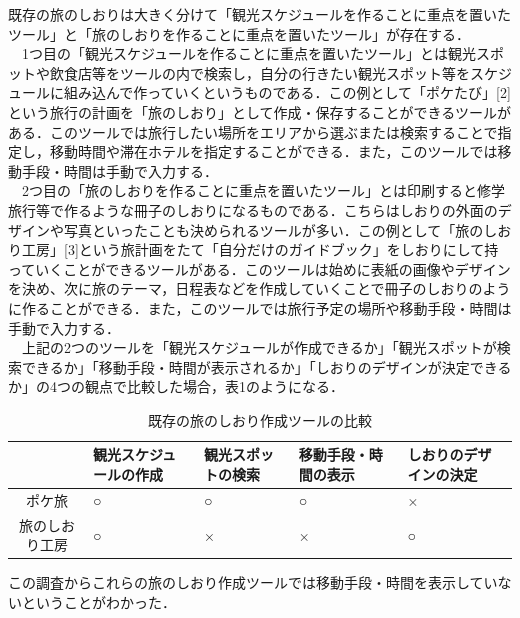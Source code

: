 \documentclass{funthesis}
\begin{document}
既存の旅のしおりは大きく分けて「観光スケジュールを作ることに重点を置いたツール」と「旅のしおりを作ることに重点を置いたツール」が存在する．\\
　1つ目の「観光スケジュールを作ることに重点を置いたツール」とは観光スポットや飲食店等をツールの内で検索し，自分の行きたい観光スポット等をスケジュールに組み込んで作っていくというものである．この例として「ポケたび」[2]という旅行の計画を「旅のしおり」として作成・保存することができるツールがある．このツールでは旅行したい場所をエリアから選ぶまたは検索することで指定し，移動時間や滞在ホテルを指定することができる．また，このツールでは移動手段・時間は手動で入力する．\\
　2つ目の「旅のしおりを作ることに重点を置いたツール」とは印刷すると修学旅行等で作るような冊子のしおりになるものである．こちらはしおりの外面のデザインや写真といったことも決められるツールが多い．この例として「旅のしおり工房」[3]という旅計画をたて「自分だけのガイドブック」をしおりにして持っていくことができるツールがある．このツールは始めに表紙の画像やデザインを決め、次に旅のテーマ，日程表などを作成していくことで冊子のしおりのように作ることができる．また，このツールでは旅行予定の場所や移動手段・時間は手動で入力する．\\
　上記の2つのツールを「観光スケジュールが作成できるか」「観光スポットが検索できるか」「移動手段・時間が表示されるか」「しおりのデザインが決定できるか」の4つの観点で比較した場合，表1のようになる．

\begin{table}[htb]
\begin{center}
\caption{既存の旅のしおり作成ツールの比較}
  \begin{tabular}{|c|p{2.4cm}|p{2.4cm}|p{2.4cm}|p{2.4cm}|} \hline
     & 観光スケジュールの作成 & 観光スポットの検索 & 移動手段・時間の表示 & しおりのデザインの決定 \\ \hline 
    ポケ旅 & ○ & ○ & ○ & × \\ \hline
    旅のしおり工房 & ○ & × & × & ○ \\ \hline
  \end{tabular}
  \end{center}
\end{table}


この調査からこれらの旅のしおり作成ツールでは移動手段・時間を表示していないということがわかった．\\
\end{document}
